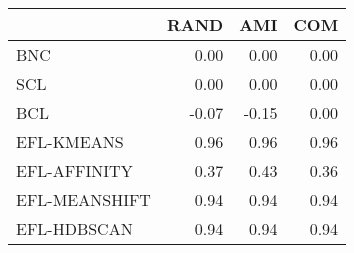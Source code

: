 \begin{tabular}{lrrr}
\toprule
 & RAND & AMI & COM \\
\midrule
BNC & 0.00 & 0.00 & 0.00 \\
SCL & 0.00 & 0.00 & 0.00 \\
BCL & -0.07 & -0.15 & 0.00 \\
EFL-KMEANS & 0.96 & 0.96 & 0.96 \\
EFL-AFFINITY & 0.37 & 0.43 & 0.36 \\
EFL-MEANSHIFT & 0.94 & 0.94 & 0.94 \\
EFL-HDBSCAN & 0.94 & 0.94 & 0.94 \\
\bottomrule
\end{tabular}
